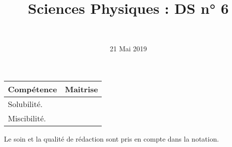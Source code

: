 \documentclass[a4paper,11pt]{exam}
\author{\ }
\date{21 Mai 2019}
\title{Sciences Physiques : DS n° 6}
\begin{document}
%	


	\maketitle


\begin{small}
	\begin{center}
		\begin{tabular}{|@{\ }l@{}|@{\ }c@{\ }|}
			\hline
			\textbf{Compétence} & \textbf{Maitrise} \\
			\hline
			 Solubilité. \hspace*{5cm} \ \ &  \ \ \ \\ 
			\hline
			Miscibilité. \hspace*{5cm} \ \ &  \\
			
			\hline
			
		\end{tabular}
	\end{center}
\end{small}	
%	

Le soin et la qualité de rédaction sont pris en compte dans la notation.

\vspace*{-0.5cm}
%









\newpage

%





\ \label{LastPage}
\end{document}
